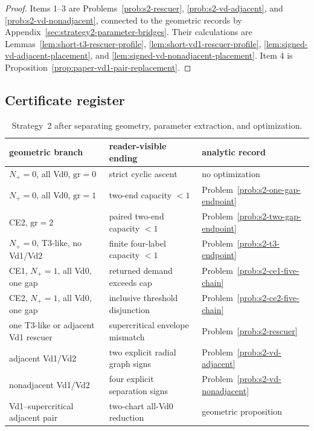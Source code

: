 \begin{proof}
Items 1--3 are Problems~\ref{prob:s2-rescuer},
\ref{prob:s2-vd-adjacent}, and \ref{prob:s2-vd-nonadjacent}, connected to the
geometric records by Appendix~\ref{sec:strategy2-parameter-bridges}.  Their
calculations are Lemmas~\ref{lem:short-t3-rescuer-profile},
\ref{lem:short-vd1-rescuer-profile},
\ref{lem:signed-vd-adjacent-placement}, and
\ref{lem:signed-vd-nonadjacent-placement}.  Item 4 is
Proposition~\ref{prop:paper-vd1-pair-replacement}.
\end{proof}

\subsection{Certificate register}

\begin{table}[H]
\centering
\small
\renewcommand{\arraystretch}{1.14}
\begin{tabular}{@{}p{}p{}p{}@{}}
\toprule
geometric branch&reader-visible ending&analytic record\\
\midrule
\(N_+=0\), all Vd0, \(\mathrm{gr}=0\)
&strict cyclic ascent&no optimization\\
\(N_+=0\), all Vd0, \(\mathrm{gr}=1\)
&two-end capacity \(<1\)&Problem~\ref{prob:s2-one-gap-endpoint}\\
CE2, \(\mathrm{gr}=2\)
&paired two-end capacity \(<1\)&Problem~\ref{prob:s2-two-gap-endpoint}\\
\(N_+=0\), T3-like, no Vd1/Vd2
&finite four-label capacity \(<1\)&Problem~\ref{prob:s2-t3-endpoint}\\
CE1, \(N_+=1\), all Vd0, one gap
&returned demand exceeds cap&Problem~\ref{prob:s2-ce1-five-chain}\\
CE2, \(N_+=1\), all Vd0, one gap
&inclusive threshold disjunction&Problem~\ref{prob:s2-ce2-five-chain}\\
one T3-like or adjacent Vd1 rescuer
&supercritical envelope mismatch&Problem~\ref{prob:s2-rescuer}\\
adjacent Vd1/Vd2
&two explicit radial graph signs&Problem~\ref{prob:s2-vd-adjacent}\\
nonadjacent Vd1/Vd2
&four explicit separation signs&Problem~\ref{prob:s2-vd-nonadjacent}\\
Vd1--supercritical adjacent pair
&two-chart all-Vd0 reduction&geometric proposition\\
\bottomrule
\end{tabular}
\caption{Strategy~2 after separating geometry, parameter extraction, and
optimization.}
\label{tab:body-strategy2-chains}
\end{table}

